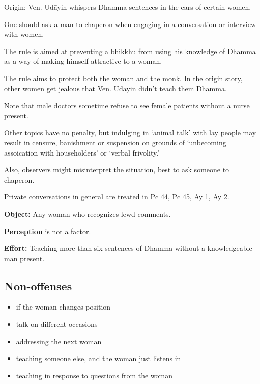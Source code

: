 \begin{multicols}{2}

Origin: Ven. Udāyin whispers Dhamma sentences in the ears of certain
women.

One should ask a man to chaperon when engaging in a conversation or
interview with women.

The rule is aimed at preventing a bhikkhu from using his knowledge of
Dhamma as a way of making himself attractive to a woman.

The rule aims to protect both the woman and the monk. In the origin
story, other women get jealous that Ven. Udāyin didn't teach them
Dhamma.

Note that male doctors sometime refuse to see female patients without a
nurse present.

Other topics have no penalty, but indulging in `animal talk' with lay
people may result in censure, banishment or suspension on grounds of
`unbecoming assoication with householders' or `verbal frivolity.'

Also, observers might misinterpret the situation, best to ask someone to
chaperon.

Private conversations in general are treated in Pc 44, Pc 45, Ay 1, Ay
2.

\columnbreak

\textbf{Object:} Any woman who recognizes lewd comments.

\textbf{Perception} is not a factor.

\textbf{Effort:} Teaching more than six sentences of Dhamma without a
knowledgeable man present.

\subsection{Non-offenses}

\begin{itemize}
\tightlist
\item
  if the woman changes position
\item
  talk on different occasions
\item
  addressing the next woman
\item
  teaching someone else, and the woman just listens in
\item
  teaching in response to questions from the woman
\end{itemize}

\end{multicols}

